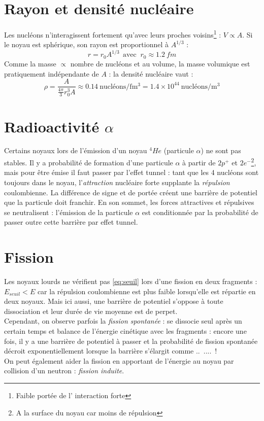 \documentclass	[11pt, a4paper, openany]{book}
\begin{document}
\section{Rayon et densité nucléaire}
Les nucléons n'interagissent fortement qu'avec leurs proches voisins\footnote{Faible portée de l'
interaction forte} : $V \propto A$. Si le noyau est sphérique, son rayon est proportionnel à $A^{
1/3}$ :
\begin{equation}
r = r_0A^{1/3}\ \ \text{avec }\ r_0 \approx 1.2\ fm
\end{equation}
Comme la masse $\propto$ nombre de nucléons et au volume, la masse volumique est pratiquement indépendante
 de $A$ : la densité nucléaire vaut : 
\begin{equation}
\rho = \frac{A}{\frac{4\pi}{3}r_0^3A}\approx 0.14\ \text{nucléons/fm$^3$} = 1.4\times
10^{44}\ \text{nucléons/m$^3$}
\end{equation}

\section{Radioactivité $\alpha$}
Certains noyaux lors de l'émission d'un noyau $^4He$ (particule $\alpha$) ne sont pas stables. Il 
y a probabilité de formation d'une particule $\alpha$ à partir  de $2 p^+$ et $2 e^-$\footnote{A la 
surface du noyau car moins de répulsion}, mais pour être émise il faut passer par l'effet tunnel : 
tant que les 4 nucléons sont toujours dans le noyau, l'\textit{attraction} nucléaire forte supplante 
la \textit{répulsion} coulombienne. La différence de signe et de portée créent une barrière de 
potentiel que la particule doit franchir. En son sommet, les forces attractives et répulsives se 
neutralisent : l'émission de la particule $\alpha$ est conditionnée par la probabilité de passer outre
cette barrière par effet tunnel.

\section{Fission}
Les noyaux lourds ne vérifient pas \autoref{eq:seuil} lors d'une fission en deux fragments : $E_{
seuil} < E$ car la répulsion coulombienne est plus faible lorsqu'elle est répartie en deux noyaux.
Mais ici aussi, une barrière de potentiel s'oppose à toute dissociation et leur durée de vie moyenne
est de perpet.\\

Cependant, on observe parfois la \textit{fission spontanée} : se dissocie seul après un certain temps
et balance de l'énergie cinétique avec les fragments : encore une fois, il y a une barrière de 
potentiel à passer et la probabilité de fission spontanée décroit exponentiellement lorsque la 
barrière s'élargit comme ..\ ....\ !\\
On peut également aider la fission en apportant de l'énergie au noyau par collision d'un neutron : 
\textit{fission induite}.
\end{document}
